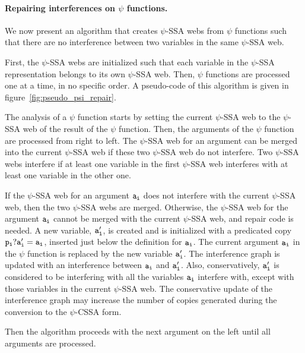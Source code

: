\paragraph{Repairing interferences on $\psi$ functions.}
We now present an algorithm that creates $\psi$-SSA webs from $\psi$
functions such that there are no interference between two variables in
the same $\psi$-SSA web.

First, the $\psi$-SSA webs are initialized such that each variable in
the $\psi$-SSA representation belongs to its own $\psi$-SSA web. Then,
$\psi$ functions are processed one at a time, in no specific order. A
pseudo-code of this algorithm is given in
figure~\ref{fig:pseudo_psi_repair}.

The analysis of a $\psi$ function starts by setting the current
$\psi$-SSA web to the $\psi$-SSA web of the result of the $\psi$
function. Then, the arguments of the $\psi$ function are processed
from right to left. The $\psi$-SSA web for an argument can be merged
into the current $\psi$-SSA web if these two $\psi$-SSA web do not
interfere. Two $\psi$-SSA webs interfere if at least one variable in
the first $\psi$-SSA web interferes with at least one variable in the
other one.

If the $\psi$-SSA web for an argument ${\tt a_i}$ does not interfere
with the current $\psi$-SSA web, then the two $\psi$-SSA webs are
merged. Otherwise, the $\psi$-SSA web for the argument ${\tt a_i}$
cannot be merged with the current $\psi$-SSA web, and repair code is
needed. A new variable, ${\tt a'_i}$, is created and is initialized
with a predicated copy ${\tt p_i? a'_i = a_i}$, inserted just below
the definition for ${\tt a_i}$. The current argument ${\tt a_i}$ in
the $\psi$ function is replaced by the new variable ${\tt a'_i}$. The
interference graph is updated with an interference between ${\tt a_i}$
and ${\tt a'_i}$. Also, conservatively, ${\tt a'_i}$ is considered to
be interfering with all the variables ${\tt a_i}$ interfere with,
except with those variables in the current $\psi$-SSA web. The
conservative update of the interference graph may increase the number
of copies generated during the conversion to the $\psi$-CSSA form.

Then the algorithm proceeds with the next argument on the left until
all arguments are processed.

